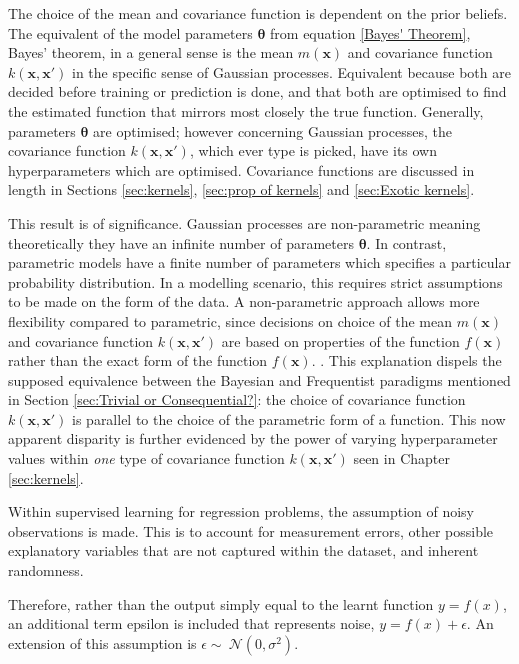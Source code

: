 \documentclass[12pt,a4paper]{article}
\begin{document}
The choice of the mean and covariance function is dependent on the prior beliefs. The equivalent of the model parameters \(\boldsymbol{\theta}\) from equation \eqref{Bayes' Theorem}, Bayes' theorem, in a general sense is the mean \(m(\mathbf{x})\) and covariance function \(k(\mathbf{x},\mathbf{x'})\) in the specific sense of Gaussian processes. Equivalent because both are decided before training or prediction is done, and that both are optimised to find the estimated function that mirrors most closely the true function. Generally, parameters \(\boldsymbol{\theta}\) are optimised; however concerning Gaussian processes, the covariance function \(k(\mathbf{x},\mathbf{x'})\), which ever type is picked, have its own hyperparameters which are optimised. Covariance functions are discussed in length in Sections \ref{sec:kernels}, \ref{sec:prop of kernels} and \ref{sec:Exotic kernels}.

This result is of significance. Gaussian processes are non-parametric meaning theoretically they have an infinite number of parameters \(\boldsymbol{\theta}\). In contrast, parametric models have a finite number of parameters which specifies a particular probability distribution. In a modelling scenario, this requires strict assumptions to be made on the form of the data. A non-parametric approach allows more flexibility compared to parametric, since decisions on choice of the mean \(m(\mathbf{x})\) and covariance function \(k(\mathbf{x},\mathbf{x'})\) are based on properties of the function \(f(\mathbf{x})\) rather than the exact form of the function \(f(\mathbf{x})\). \citep{seymour2022bayesian}. This explanation dispels the supposed equivalence between the Bayesian and Frequentist paradigms mentioned in Section \ref{sec:Trivial or Consequential?}: the choice of covariance function \(k(\mathbf{x},\mathbf{x'})\) is parallel to the choice of the parametric form of a function. This now apparent disparity is further evidenced by the power of varying hyperparameter values within \textit{one} type of covariance function \(k(\mathbf{x},\mathbf{x'})\) seen in Chapter \ref{sec:kernels}.

Within supervised learning for regression problems, the assumption of noisy observations is made. This is to account for measurement errors, other possible explanatory variables that are not captured within the dataset, and inherent randomness.

Therefore, rather than the output simply equal to the learnt function \(y = f(x)\), an additional term epsilon is included that represents noise, \(y = f(x) + \epsilon\). 
An extension of this assumption is \(\epsilon \sim \ \mathcal{N}(0,  \sigma^2)\).
\end{document}
